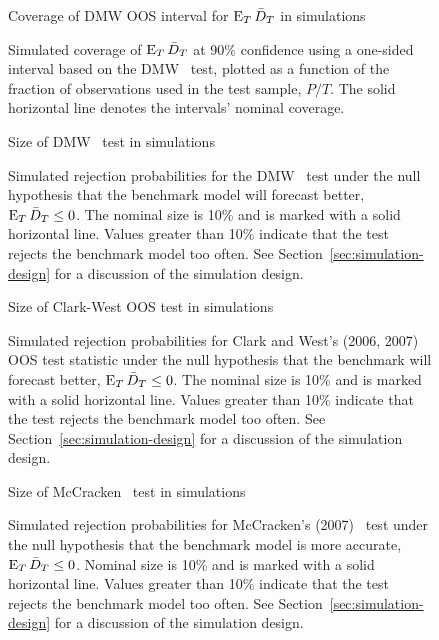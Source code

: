 \documentclass[12pt,draft]{article}
\begin{document}
\begin{figure}\centering
  {\large Coverage of DMW OOS interval for $\operatorname{E}_T\bar{D}_{T}$ in simulations}
  \caption{Simulated coverage of $\operatorname{E}_T \bar{D}_{T}$ at 90\% confidence using
    a one-sided interval based on the DMW \oost\ test, plotted as a
    function of the fraction of observations used in the test sample,
    $P/T$.  The solid horizontal line denotes the intervals' nominal
    coverage.}
  \label{fig:interval-T}
\end{figure}
\clearpage

\begin{figure}\centering
  {\large Size of DMW \oost\ test in simulations}
  \caption{Simulated rejection probabilities for the DMW \oost\ test
    under the null hypothesis that the benchmark model will forecast
    better, $\operatorname{E}_T \bar{D}_{T} \leq 0$. The nominal size is 10\% and is
    marked with a solid horizontal line. Values greater than 10\%
    indicate that the test rejects the benchmark model too often. See
    Section~\ref{sec:simulation-design} for a discussion of the
    simulation design.}
  \label{fig:ttest-size}
\end{figure}
\clearpage

\begin{figure}\centering
  {\large Size of Clark-West OOS test in simulations}
  \caption{Simulated rejection probabilities for Clark and West's
    (2006, 2007) OOS test statistic under the null hypothesis that the
    benchmark will forecast better, $\operatorname{E}_T \bar{D}_{T} \leq 0$. The nominal
    size is 10\% and is marked with a solid horizontal line. Values
    greater than 10\% indicate that the test rejects the benchmark
    model too often. See Section~\ref{sec:simulation-design} for a
    discussion of the simulation design.}
   \label{fig:clarkwest}
\end{figure}
\clearpage

\begin{figure}\centering
  {\large Size of McCracken \oost\ test in simulations}
  \caption{Simulated rejection probabilities for McCracken's (2007)
    \oost\ test under the null hypothesis that the benchmark model is
    more accurate, $\operatorname{E}_T \bar{D}_{T} \leq 0$. Nominal size is 10\% and is
    marked with a solid horizontal line. Values greater than 10\%
    indicate that the test rejects the benchmark model too often. See
    Section~\ref{sec:simulation-design} for a discussion of the
    simulation design.}
  \label{fig:mccracken}
\end{figure}
\clearpage
\end{document}
